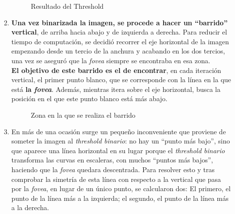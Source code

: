 \begin{enumerate}
\begin{enumerate}[label*=\arabic*.]
    \begin{figure}[H]
      \caption{Resultado del Threshold}
      \centering \setlength\fboxsep{0pt} \setlength\fboxrule{0.5pt}
    \end{figure}

  \item \textbf{Una vez binarizada la imagen, se procede a hacer un
      ``barrido'' vertical}, de arriba hacia abajo y de izquierda a
    derecha. Para reducir el tiempo de computación, se decidió
    recorrer el eje horizontal de la imagen empezando desde un tercio
    de la anchura y acabando en los dos tercios, una vez se aseguró
    que la \emph{\gls{fovea}} siempre se encontraba en esa zona. \\
    \textbf{ El objetivo de este barrido es el de encontrar}, en cada
    iteración vertical, el primer punto blanco, que se corresponde con
    la línea en la que está \textbf{la \emph{\gls{fovea}}}. Además,
    mientras itera sobre el eje horizontal, busca la posición en el
    que este punto blanco está más abajo.

    \begin{figure}[H]
      \caption{Zona en la que se realiza el barrido}
      \centering \setlength\fboxsep{0pt} \setlength\fboxrule{0.5pt}
    \end{figure}

  \item En más de una ocasión surge un pequeño inconveniente que
    proviene de someter la imagen al \emph{threshold binario}: no hay
    un ``punto más bajo'', sino que aparece una línea horizontal en su
    lugar porque el \emph{threshold binario} transforma las curvas en
    escaleras, con muchos ``puntos más bajos'', haciendo que la
    \emph{\gls{fovea}} quedara descentrada. Para resolver esto y tras
    comprobar la simetría de esta línea con respecto a la vertical que
    pasa por la \emph{\gls{fovea}}, en lugar de un único punto, se
    calcularon dos: El primero, el punto de la línea más a la
    izquierda; el segundo, el punto de la línea más a la derecha.


\end{enumerate}
\end{enumerate}

